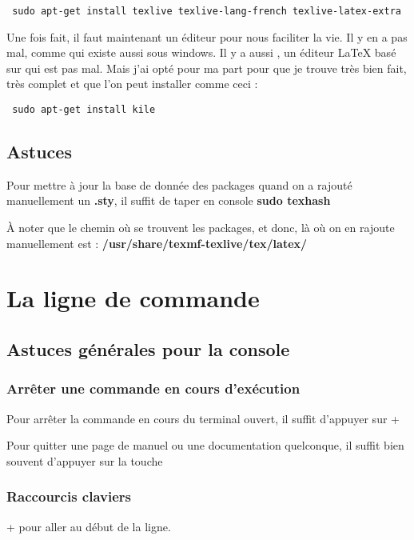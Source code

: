 \documentclass[a4paper,twoside]{article}
\begin{document}
\begin{verbatim}
 sudo apt-get install texlive texlive-lang-french texlive-latex-extra
\end{verbatim}

Une fois fait, il faut maintenant un éditeur pour nous faciliter la vie. Il y en a pas mal, comme  qui existe aussi sous windows. Il y a aussi , un éditeur \LaTeX{} basé sur  qui est pas mal. Mais j'ai opté pour ma part pour  que je trouve très bien fait, très complet et que l'on peut installer comme ceci :
\begin{verbatim}
 sudo apt-get install kile
\end{verbatim}

\subsection{Astuces}

Pour mettre à jour la base de donnée des packages quand on a rajouté manuellement un \textbf{.sty}, il suffit de taper en console \textbf{sudo texhash}

À noter que le chemin où se trouvent les packages, et donc, là où on en rajoute manuellement est : \textbf{/usr/share/texmf-texlive/tex/latex/}

\section{La ligne de commande}
\subsection{Astuces générales pour la console}
\subsubsection{Arrêter une commande en cours d'exécution}
Pour arrêter la commande en cours du terminal ouvert, il suffit d'appuyer sur + 

Pour quitter une page de manuel ou une documentation quelconque, il suffit bien souvent d'appuyer sur la touche 

\subsubsection{Raccourcis claviers}
 +  pour aller au début de la ligne.
\end{document}

